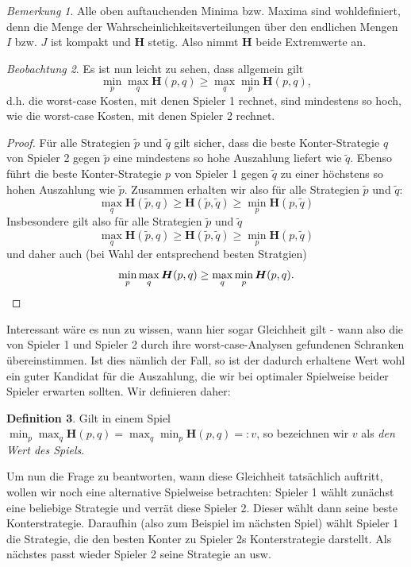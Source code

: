 \documentclass[a4paper,ngerman,12pt,bibtotoc]{scrartcl}
\theoremstyle{definition}
\newtheorem{defn}{Definition}[section]
\theoremstyle{plain}
\theoremstyle{remark}
\newtheorem{bem}[defn]{Bemerkung}
\newtheorem{beob}[defn]{Beobachtung}
\renewcommand{\_}{\mathpunct{.}\,}
\newcommand{\?}{\,{:}\,}
\renewcommand{\sp}{\tilde{p}}		%
\newcommand{\sq}{\tilde{q}}		%
\newcommand{\EH}{\boldsymbol{H}}
\begin{document}
	\begin{bem}
		Alle oben auftauchenden Minima bzw. Maxima sind wohldefiniert, denn die Menge der Wahrscheinlichkeitsverteilungen über den endlichen Mengen $I$ bzw. $J$ ist kompakt und $\EH$ stetig. Also nimmt $\EH$ beide Extremwerte an.
	\end{bem}
	
	\begin{beob}\label{beob:minmaxgeqmaxmin}
		Es ist nun leicht zu sehen, dass allgemein gilt 
			\[\min_p \max_q \EH(p,q) \geq \max_q \min_p \EH(p,q),\]
		d.h. die worst-case Kosten, mit denen Spieler 1 rechnet, sind mindestens so hoch, wie die worst-case Kosten, mit denen Spieler 2 rechnet.
		
	\end{beob}

	\begin{proof}
		Für alle Strategien $\sp$ und $\sq$ gilt sicher, dass die beste Konter-Strategie $q$ von Spieler 2 gegen $\sp$ eine mindestens so hohe Auszahlung liefert wie $\sq$. Ebenso führt die beste Konter-Strategie $p$ von Spieler 1 gegen $\sq$ zu einer höchstens so hohen Auszahlung wie $\sp$. Zusammen erhalten wir also für alle Strategien  $\sp$ und $\sq$:
			\[\max_q\EH(\sp,q) \geq \EH(\sp,\sq) \geq \min_p\EH(p,\sq)\]
		Insbesondere gilt also für alle Strategien $\sp$ und $\sq$
			\[\max_q\EH(\sp,q) \geq \EH(\sp,\sq) \geq \min_p\EH(p,\sq)\]
		und daher auch (bei Wahl der entsprechend besten Stratgien)
			\[\min_p \max_q \EH(p,q) \geq \max_q \min_p \EH(p,q). \qedhere\]
		\end{proof}	
	
	Interessant wäre es nun zu wissen, wann hier sogar Gleichheit gilt - wann also die von Spieler 1 und Spieler 2 durch ihre worst-case-Analysen gefundenen Schranken übereinstimmen. Ist dies nämlich der Fall, so ist der dadurch erhaltene Wert wohl ein guter Kandidat für die Auszahlung, die wir bei optimaler Spielweise beider Spieler erwarten sollten. Wir definieren daher:
	
	\begin{defn}
		Gilt in einem Spiel $\min_p \max_q \EH(p,q) = \max_q \min_p \EH(p,q) =: v$, so bezeichnen wir $v$ als \emph{den Wert des Spiels}.
	\end{defn}
	
	Um nun die Frage zu beantworten, wann diese Gleichheit tatsächlich auftritt, wollen wir noch eine alternative Spielweise betrachten: Spieler 1 wählt zunächst eine beliebige Strategie und verrät diese Spieler 2. Dieser wählt dann seine beste Konterstrategie. Daraufhin (also zum Beispiel im nächsten Spiel) wählt Spieler 1 die Strategie, die den besten Konter zu Spieler 2s Konterstrategie darstellt. Als nächstes passt wieder Spieler 2 seine Strategie an usw.
	
\end{document}

